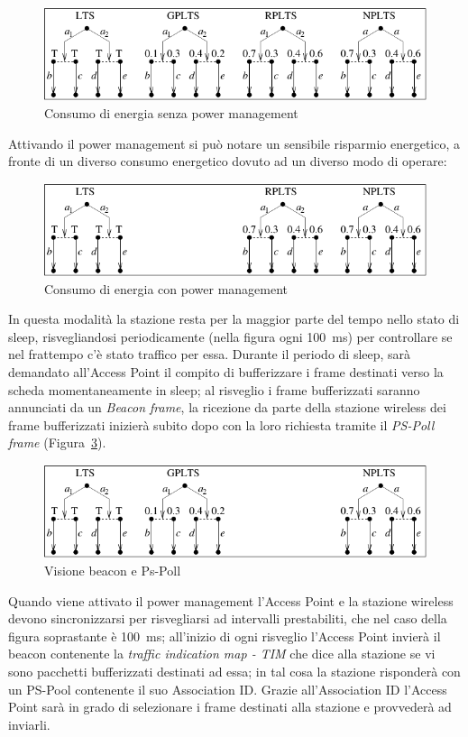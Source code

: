 \begin{figure}[htbp]
\centerline{\includegraphics{figure/consumo_senza_ps}}
\caption{Consumo di energia senza power management}
\label{fig:consumo_senza_ps}
\end{figure}

Attivando il power management si pu\`o notare un sensibile risparmio energetico, a fronte di un diverso
consumo energetico dovuto ad un diverso modo di operare: 

\begin{figure}[htbp]
\centerline{\includegraphics{figure/consumo_con_ps}}
\caption{Consumo di energia con power management}
\label{fig:consumo_con_ps}
\end{figure}

In questa modalit\`a la stazione resta per la maggior parte del tempo nello stato di sleep, risvegliandosi
periodicamente (nella figura ogni 100~ms) per controllare se nel frattempo c'\`e stato traffico per essa.
Durante il periodo di sleep, sar\`a demandato all'Access Point il compito di bufferizzare i frame destinati
verso la scheda momentaneamente in sleep; al risveglio i frame bufferizzati saranno annunciati da un {\em
Beacon frame}, la ricezione da parte della stazione wireless dei frame bufferizzati inizier\`a subito dopo
con la loro richiesta tramite il {\em PS-Poll frame} (Figura~\ref{fig:power_saving}).

\begin{figure}[htbp]
\centerline{\includegraphics{figure/power_saving}}
\caption{Visione beacon e Ps-Poll}
\label{fig:power_saving}
\end{figure}

Quando viene attivato il power management l'Access Point e la stazione wireless devono sincronizzarsi per
risvegliarsi ad intervalli prestabiliti, che nel caso della figura soprastante \`e 100~ms; all'inizio di
ogni risveglio l'Access Point invier\`a il beacon contenente la {\em traffic indication map - TIM} che dice
alla stazione se vi sono pacchetti bufferizzati destinati ad essa; in tal cosa la stazione risponder\`a con
un PS-Pool contenente il suo Association ID. Grazie all'Association ID l'Access Point sar\`a in grado di
selezionare i frame destinati alla stazione e provveder\`a ad inviarli.
